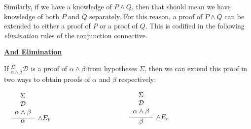 \documentclass{book}
\begin{document}
    Similarly, if we have a knowledge of $P \land Q$, then that should mean we have knowledge of both $P$ and $Q$ separately. For this reason, a proof of $P \land Q$ can be extended to either a proof of $P$ or a proof of $Q$. This is codified in the following \emph{elimination} rules of the conjunction connective. 

    \begin{mdframed}

        \underline{{\bf And Elimination}}

        If $^{\Sigma}_{\alpha \land \beta}\mathcal{D}$ is a proof of $\alpha \land \beta$ from hypotheses $\Sigma$, then we can extend this proof in two ways to obtain proofs of $\alpha$ and $\beta$ respectively: 

        \begin{center}
            $\begin{array} { c c c }
            
            \begin{array}{ c  c  c }			
                 \infer[\land E_{\ell}]{\alpha}
                    {\begin{array}{c}
                        \Sigma \\
                        \mathcal{D} \\
                        \alpha \land \beta
                    \end{array}}
            \end{array}
    
            & \hspace{3cm} &
    
            \begin{array}{ c  c  c }			
                \infer[\land E_{r}]{\beta}
                {\begin{array}{c}
                    \Sigma \\
                    \mathcal{D} \\
                    \alpha \land \beta
                \end{array}}	
            \end{array}\\		
    
            \end{array}$
        \end{center}	
    \end{mdframed}
\end{document}
